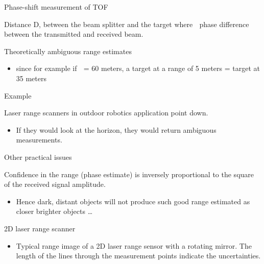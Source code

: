 \documentclass[compress]{beamer}
\begin{document}
\begin{frame}{Phase-shift measurement of TOF}

Distance D, between the beam splitter and the target where  phase
difference between the transmitted and received beam.

Theoretically ambiguous range estimates

\begin{itemize}

\item
  since for example if  = 60 meters, a target at a range of 5 meters =
  target at 35 meters
\end{itemize}

\end{frame}

\begin{frame}{Example}

Laser range scanners in outdoor robotics application point down.

\begin{itemize}

\item
  If they would look at the horizon, they would return ambiguous
  measurements.
\end{itemize}

\end{frame}

\begin{frame}{Other practical issues}

Confidence in the range (phase estimate) is inversely proportional to
the square of the received signal amplitude.

\begin{itemize}

\item
  Hence dark, distant objects will not produce such good range estimated
  as closer brighter objects \ldots{}
\end{itemize}

\end{frame}

\begin{frame}{2D laser range scanner}

\begin{itemize}

\item
  Typical range image of a 2D laser range sensor with a rotating mirror.
  The length of the lines through the measurement points indicate the
  uncertainties.
\end{itemize}

\end{frame}
\end{document}
